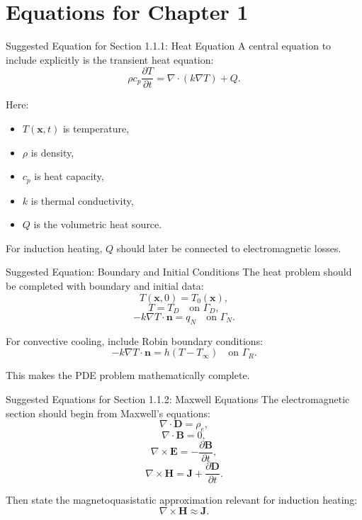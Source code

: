 \documentclass[aspectratio=169]{beamer}
\begin{document}
\section{Equations for Chapter 1}

\begin{frame}{Suggested Equation for Section 1.1.1: Heat Equation}
A central equation to include explicitly is the transient heat equation:
\[
\rho c_p \frac{\partial T}{\partial t}
=
\nabla\cdot(k\nabla T) + Q.
\]

Here:
\begin{itemize}
    \item \(T(\mathbf{x},t)\) is temperature,
    \item \(\rho\) is density,
    \item \(c_p\) is heat capacity,
    \item \(k\) is thermal conductivity,
    \item \(Q\) is the volumetric heat source.
\end{itemize}

\medskip

For induction heating, \(Q\) should later be connected to electromagnetic losses.
\end{frame}

\begin{frame}{Suggested Equation: Boundary and Initial Conditions}
The heat problem should be completed with boundary and initial data:
\[
T(\mathbf{x},0)=T_0(\mathbf{x}),
\]
\[
T = T_D \quad \text{on } \Gamma_D,
\]
\[
-k\nabla T\cdot \mathbf{n}=q_N \quad \text{on } \Gamma_N.
\]

For convective cooling, include Robin boundary conditions:
\[
-k\nabla T\cdot \mathbf{n}
=
h(T-T_\infty)
\quad \text{on } \Gamma_R.
\]

This makes the PDE problem mathematically complete.
\end{frame}

\begin{frame}{Suggested Equations for Section 1.1.2: Maxwell Equations}
The electromagnetic section should begin from Maxwell's equations:
\[
\nabla\cdot \mathbf{D}=\rho_e,
\]
\[
\nabla\cdot \mathbf{B}=0,
\]
\[
\nabla\times \mathbf{E}=-\frac{\partial \mathbf{B}}{\partial t},
\]
\[
\nabla\times \mathbf{H}=\mathbf{J}+\frac{\partial \mathbf{D}}{\partial t}.
\]

Then state the magnetoquasistatic approximation relevant for induction heating:
\[
\nabla\times \mathbf{H}\approx \mathbf{J}.
\]
\end{frame}
\end{document}
